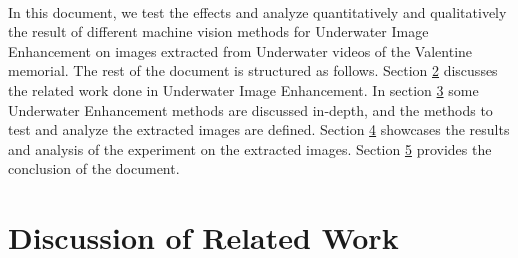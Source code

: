 \documentclass[a4paper,11pt,oneside]{article}
\begin{document}
  \\
  In this document, we test the effects and analyze quantitatively and qualitatively the result of different machine vision methods for Underwater Image Enhancement on images extracted from Underwater videos of the Valentine memorial. The rest of the document is structured as follows. Section \hyperref[sec:2]{2} discusses the related work done in Underwater Image Enhancement. In section \hyperref[sec:3]{3} some Underwater Enhancement methods are discussed in-depth, and the methods to test and analyze the extracted images are defined. Section \hyperref[sec:4]{4} showcases the results and analysis of the experiment on the extracted images. Section \hyperref[sec:5]{5} provides the conclusion of the document.  

  \section{Discussion of Related Work}
  \label{sec:2}

\end{document}
